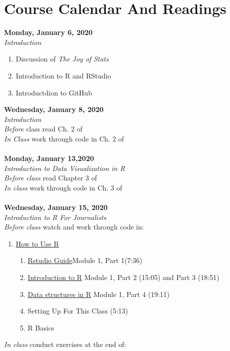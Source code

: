 \documentclass{article}
\begin{document}
\section*{Course Calendar And Readings}
\textbf{Monday, January 6, 2020}\\
\emph{Introduction}
\begin{enumerate}
\item Discussion of \emph{The Joy of Stats}
\item Introduction to R and RStudio
\item Introductdion to GitHub
\end{enumerate}
\bigskip
\textbf{Wednesday, January 8, 2020\\}
\emph{Introduction}\\
\emph{Before} class read Ch. 2 of \textcite{healy_data_2018}\\
\emph{In Class} work through code in Ch. 2 of \textcite{healy_data_2018}\\\\
\textbf{Monday, January 13,2020\\}
\emph{Introduction to Data Visualization in R\\}
\emph{Before class} read Chapter 3 of \textcite{healy_data_2018}\\
\emph{In class} work through code in Ch. 3 of \textcite{healy_data_2018}\\\\
\textbf{Wednesday, January 15, 2020\\}
\emph{Introduction to R For Journalists}\\
\emph{Before class} watch and work through code in: 
\begin{enumerate}
\item \href{http://learn.r-journalism.com/en/how_to_use_r/}{How to Use R}
\begin{enumerate}
\item \href{http://learn.r-journalism.com/en/how_to_use_r/tour_rstudio/rstudio-tour/}{Rstudio Guide}Module 1, Part 1(7:36)
\item \href{http://learn.r-journalism.com/en/how_to_use_r/intro_to_r/intro-to-r/}{Introduction to R} Module 1, Part 2 (15:05) and Part 3 (18:51)
\item \href{http://learn.r-journalism.com/en/how_to_use_r/initial_exploration/data-structures/}{Data structures in R} Module 1, Part 4 (19:11)
\item Setting Up For This Class (5:13)
\item R Basics
\end{enumerate}

\end{enumerate}
\bigskip
\emph{In class} conduct exercises at the end of: 
    
\end{document}
